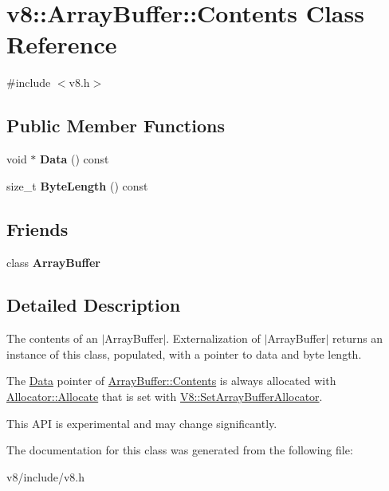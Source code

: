 \hypertarget{classv8_1_1ArrayBuffer_1_1Contents}{\section{v8\-:\-:Array\-Buffer\-:\-:Contents Class Reference}
\label{classv8_1_1ArrayBuffer_1_1Contents}
}


{\ttfamily \#include $<$v8.\-h$>$}

\subsection*{Public Member Functions}
\begin{DoxyCompactItemize}
\item 
\hypertarget{classv8_1_1ArrayBuffer_1_1Contents_a9ed7556bfaca7a0b24deb05538a76dcd}{void $\ast$ {\bfseries Data} () const }\label{classv8_1_1ArrayBuffer_1_1Contents_a9ed7556bfaca7a0b24deb05538a76dcd}

\item 
\hypertarget{classv8_1_1ArrayBuffer_1_1Contents_a1b6a3eecb4fe05f4d33c83b6bc1fa737}{size\-\_\-t {\bfseries Byte\-Length} () const }\label{classv8_1_1ArrayBuffer_1_1Contents_a1b6a3eecb4fe05f4d33c83b6bc1fa737}

\end{DoxyCompactItemize}
\subsection*{Friends}
\begin{DoxyCompactItemize}
\item 
\hypertarget{classv8_1_1ArrayBuffer_1_1Contents_acbcb25033a90500a51aa19c811b2a1d3}{class {\bfseries Array\-Buffer}}\label{classv8_1_1ArrayBuffer_1_1Contents_acbcb25033a90500a51aa19c811b2a1d3}

\end{DoxyCompactItemize}


\subsection{Detailed Description}
The contents of an $|$\-Array\-Buffer$|$. Externalization of $|$\-Array\-Buffer$|$ returns an instance of this class, populated, with a pointer to data and byte length.

The \hyperlink{classv8_1_1Data}{Data} pointer of \hyperlink{classv8_1_1ArrayBuffer_1_1Contents}{Array\-Buffer\-::\-Contents} is always allocated with \hyperlink{classv8_1_1ArrayBuffer_1_1Allocator_a106b0d80120ed04fe9b9675e96f0340b}{Allocator\-::\-Allocate} that is set with \hyperlink{classv8_1_1V8_abc40950a39f8cb6946dc8a1ad41eea84}{V8\-::\-Set\-Array\-Buffer\-Allocator}.

This A\-P\-I is experimental and may change significantly. 

The documentation for this class was generated from the following file\-:\begin{DoxyCompactItemize}
\item 
v8/include/v8.\-h\end{DoxyCompactItemize}
